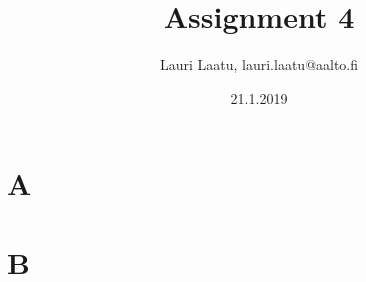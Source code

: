 \documentclass[a4paper,11pt]{extarticle}
\title{\textbf{Assignment 4}}
\author{Lauri Laatu, lauri.laatu@aalto.fi}
\date{21.1.2019}
\begin{document}
\maketitle
\renewcommand\thesection{\alph{section}}


\section{A} 

\section{B} 








\clearpage
\end{document}
